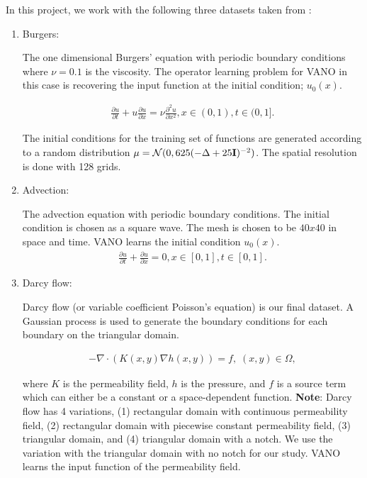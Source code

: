 \documentclass[11pt, fullpage,letterpaper]{article}
\begin{document}
In this project, we work with the following three datasets taken from \cite{fair_paper}:

\begin{enumerate}
    \item Burgers:

        The one dimensional Burgers' equation with periodic boundary conditions where $\nu=0.1$ is the viscosity. The operator learning problem for VANO in this case is recovering the input function at the initial condition; $u_0(x)$.

        \begin{align}
            \frac{\partial u}{\partial t} + u \frac{\partial u}{\partial x} = \nu \frac{\partial^2 u}{\partial x^2}, x \in (0, 1), t \in (0, 1].
        \end{align}

        The initial conditions for the training set of functions are generated according to a random distribution $\mu = \mathcal{N}(0, 625(- \Delta + 25 {\bf I})^{-2})$. The spatial resolution is done with 128 grids.

    \item Advection:

        The advection equation with periodic boundary conditions. The initial condition is chosen as a square wave. The mesh is chosen to be $40x40$ in space and time. VANO learns the initial condition $u_0(x)$.
        \begin{align}
            \frac{\partial u}{\partial t} + \frac{\partial u}{\partial x} = 0, x \in [0, 1], t \in [0, 1].
        \end{align}

    \item Darcy flow:

        Darcy flow (or variable coefficient Poisson's equation) is our final dataset. A Gaussian process is used to generate the boundary conditions for each boundary on the triangular domain.

        \begin{align}
            - \nabla \cdot (K(x, y) \nabla h(x, y)) = f, \; (x, y) \in \Omega,
        \end{align}

        where $K$ is the permeability field, $h$ is the pressure, and $f$ is a source term which can either be a constant or a space-dependent function. \textbf{Note}: Darcy flow has 4 variations, (1) rectangular domain with continuous permeability field, (2) rectangular domain with piecewise constant permeability field, (3) triangular domain, and (4) triangular domain with a notch. We use the variation with the triangular domain with no notch for our study. VANO learns the input function of the permeability field.
\end{enumerate}
\end{document}
